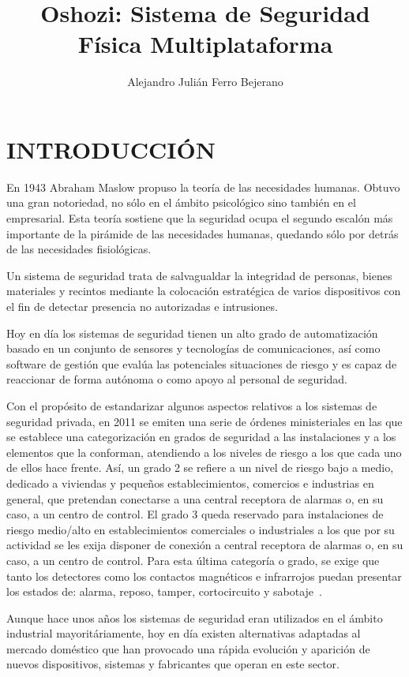 \documentclass{pre-tfg}
\title{Oshozi: Sistema de Seguridad Física Multiplataforma}
\author{Alejandro Julián Ferro Bejerano}
\begin{document}
\maketitle
\tableofcontents

\newpage

\section{INTRODUCCIÓN}

En 1943 Abraham Maslow propuso la teoría de las necesidades humanas. Obtuvo una gran
notoriedad, no sólo en el ámbito psicológico sino también en el empresarial. Esta teoría
sostiene que la seguridad ocupa el segundo escalón más importante de la pirámide de las
necesidades humanas, quedando sólo por detrás de las necesidades fisiológicas.

Un sistema de seguridad trata de salvagualdar la integridad de personas, bienes materiales y recintos mediante la colocación estratégica de varios dispositivos con el fin de detectar presencia no autorizadas e intrusiones. 

Hoy en día los sistemas de seguridad tienen un alto grado de automatización basado en un conjunto de sensores y tecnologías de comunicaciones, así como software de gestión que evalúa las potenciales situaciones de riesgo y es capaz de reaccionar de forma autónoma o como apoyo al personal de seguridad.

Con el propósito de estandarizar algunos aspectos relativos a los sistemas de seguridad privada, en 2011 se emiten una serie de órdenes ministeriales en las que se establece una categorización en grados de seguridad a las instalaciones y a los elementos que la conforman, atendiendo a los niveles de riesgo a los que cada uno de ellos hace frente. Así, un grado 2 se refiere a un nivel de riesgo bajo a medio, dedicado a viviendas y pequeños
establecimientos, comercios e industrias en general, que pretendan conectarse a una central receptora de alarmas o, en su caso, a un centro de control. El grado 3 queda reservado para instalaciones de riesgo medio/alto en establecimientos comerciales o industriales a los que por su actividad se les exija disponer de conexión a central receptora de alarmas o, en su caso, a un centro de control. Para esta última categoría o grado, se exige que tanto los detectores como los contactos magnéticos e infrarrojos puedan presentar los estados de: alarma, reposo, tamper, cortocircuito y sabotaje~\cite{BOE}.

Aunque hace unos años los sistemas de seguridad eran utilizados en el ámbito industrial mayoritáriamente, hoy en día existen alternativas adaptadas al mercado doméstico que han provocado una rápida evolución y aparición de nuevos dispositivos, sistemas y fabricantes que operan en este sector. 
\end{document}
